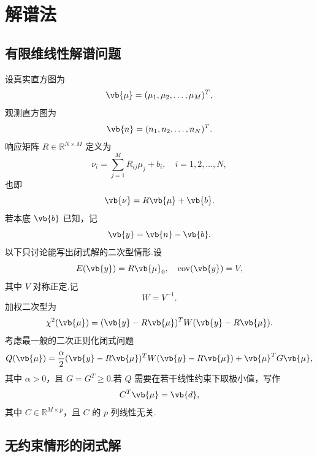 \section{解谱法}

\subsection{有限维线性解谱问题}

设真实直方图为
\begin{equation*}
	\vb{\mu}=(\mu_1,\mu_2,\ldots,\mu_M)^T,
\end{equation*}
观测直方图为
\begin{equation*}
	\vb{n}=(n_1,n_2,\ldots,n_N)^T.
\end{equation*}
响应矩阵 \(R\in\mathbb{R}^{N\times M}\) 定义为
\begin{equation*}
	\nu_i=\sum_{j=1}^{M}R_{ij}\mu_j+b_i,
	\quad i=1,2,\ldots,N,
\end{equation*}
也即
\begin{equation*}
	\vb{\nu}=R\vb{\mu}+\vb{b}.
\end{equation*}
若本底 \(\vb{b}\) 已知，记
\begin{equation*}
	\vb{y}=\vb{n}-\vb{b}.
\end{equation*}
以下只讨论能写出闭式解的二次型情形.设
\begin{equation*}
	E(\vb{y})=R\vb{\mu}_0,\quad
	\operatorname{cov}(\vb{y})=V,
\end{equation*}
其中 \(V\) 对称正定.记
\begin{equation*}
	W=V^{-1}.
\end{equation*}
加权二次型为
\begin{equation*}
	\chi^2(\vb{\mu})
	=(\vb{y}-R\vb{\mu})^TW(\vb{y}-R\vb{\mu}).
\end{equation*}
考虑最一般的二次正则化闭式问题
\begin{equation*}
	Q(\vb{\mu})
	=\frac{\alpha}{2}(\vb{y}-R\vb{\mu})^TW(\vb{y}-R\vb{\mu})
	+\vb{\mu}^TG\vb{\mu},
\end{equation*}
其中 \(\alpha>0\)，且 \(G=G^T\geq0\).若 \(Q\) 需要在若干线性约束下取极小值，写作
\begin{equation*}
	C^T\vb{\mu}=\vb{d},
\end{equation*}
其中 \(C\in\mathbb{R}^{M\times p}\)，且 \(C\) 的 \(p\) 列线性无关.

\subsection{无约束情形的闭式解}

